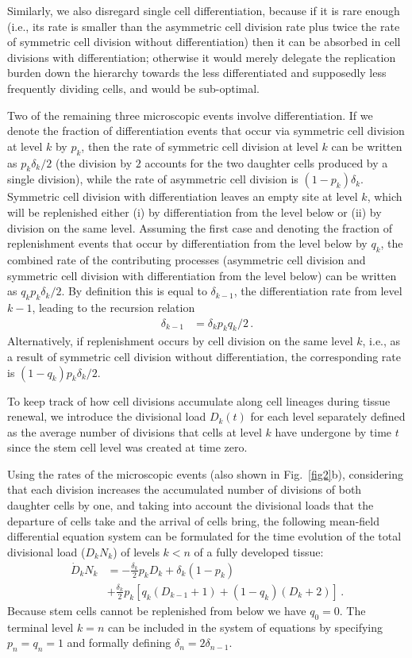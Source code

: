 \documentclass[aps,singlecolumn]{revtex4-1}
\begin{document}
Similarly, we also disregard single cell differentiation, because if
it is rare enough (i.e., its rate is smaller than the asymmetric cell
division rate plus twice the rate of symmetric cell division without
differentiation) then it can be absorbed in 
cell divisions with differentiation; otherwise it would merely delegate the
replication burden down the hierarchy towards the less differentiated
and supposedly less frequently dividing cells, and would be
sub-optimal.

Two of the remaining three microscopic events involve
differentiation. If we denote the fraction of differentiation events
that occur via symmetric cell division at level $k$ by $p_k$, then the
rate of symmetric cell division at level $k$ can be written as
$p_k \delta_k /2$ (the division by $2$
accounts for the two daughter cells produced by a single division),
while the rate of asymmetric cell division is $(1-p_k)\delta_k$.
Symmetric cell division with differentiation leaves an
empty site at level $k$, which will be replenished either
(i) by differentiation from the
level below or (ii) by division on the same level. Assuming the first
case and denoting the
fraction of replenishment events that occur by differentiation from the
level below by $q_k$, the combined rate of the contributing processes
(asymmetric cell division and symmetric cell division with
differentiation from the level below) can be written as $q_k
p_k \delta_k /2$. By definition this is equal
to $\delta_{k-1}$, the differentiation rate from level $k-1$,
leading to the recursion relation
%
\begin{align}
 \delta_{k-1} &= \delta_k p_k q_k /2
\, .
\end{align}
%
Alternatively, if replenishment occurs by cell
division on the same level $k$, i.e., as a result of symmetric cell
division without differentiation, the corresponding rate is $(1-q_k)
p_k \delta_k /2$.

To keep track of how cell divisions accumulate along cell lineages during
tissue renewal, we introduce the divisional load $D_k(t)$ for each
level separately defined as the
average number of divisions that cells at level $k$ have undergone by
time $t$ since the stem cell level was created at time zero.

Using the rates of the microscopic events (also shown in Fig.~\ref{fig2}b),
considering that each division increases the accumulated number
of divisions of both daughter cells by one, and taking into
account the divisional loads that the departure of cells
take and the arrival of cells bring, the following mean-field differential
equation system can be formulated for the time evolution of the total
divisional load ($D_k N_k$) of levels $k<n$ of a fully developed tissue:
%
\begin{align}
 \dot D_k N_k &= - \frac{\delta_k}{2} p_k D_k+ \delta_k (1-p_k)
\nonumber\\
 &+ \frac{\delta_k}{2} p_k \left[ q_k (D_{k-1}+1) + (1-q_k)(D_k+2) \right]
\, .\label{dotD}
\end{align}
%
Because stem cells cannot be replenished from below we have $q_0=0$. The
terminal level $k=n$ can be included in the system of equations by
specifying $p_n=q_n=1$ and formally defining $\delta_n=2 \delta_{n-1}$.
\end{document}
